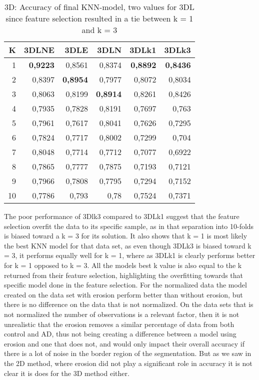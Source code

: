 \begin{table}[H]
  \centering
    \begin{tabular}{|r|r|r|r|r|r|}
    \hline
    K     & 3DLNE & 3DLE  & 3DLN  & 3DLk1 & 3DLk3 \\ \hline
    1     & \textbf{0,9223} & 0,8561 & 0,8374 & \textbf{0,8892} & \textbf{0,8436} \\ \hline
    2     & 0,8397 & \textbf{0,8954} & 0,7977 & 0,8072 & 0,8034 \\ \hline
    3     & 0,8063 & 0,8199 & \textbf{0,8914} & 0,8261 & 0,8426 \\ \hline
    4     & 0,7935 & 0,7828 & 0,8191 & 0,7697 & 0,763 \\ \hline
    5     & 0,7961 & 0,7617 & 0,8041 & 0,7626 & 0,7295 \\ \hline
    6     & 0,7824 & 0,7717 & 0,8002 & 0,7299 & 0,704 \\ \hline
    7     & 0,8048 & 0,7714 & 0,7712 & 0,7077 & 0,6922 \\ \hline
    8     & 0,7865 & 0,7777 & 0,7875 & 0,7193 & 0,7121 \\ \hline
    9     & 0,7966 & 0,7808 & 0,7795 & 0,7294 & 0,7152 \\ \hline
    10    & 0,7786 & 0,793 & 0,78  & 0,7524 & 0,7371 \\ \hline
    \end{tabular}%
  \caption{3D: Accuracy of final KNN-model, two values for 3DL since feature selection resulted in a tie between k = 1 and k = 3}\label{tab:3DFinalModel}%
\end{table}%
The poor performance of 3Dlk3 compared to 3DLk1 suggest that the feature selection overfit the data to its specific sample, as in that separation into 10-folds is biased toward a k = 3 for its solution. It also shows that k = 1 is most likely the best KNN model for that data set, as even though 3DLk3 is biased toward k = 3, it performs equally well for k = 1, where as 3DLk1 is clearly performs better for k = 1 opposed to k = 3. All the models best k value is also equal to the k returned from their feature selection, highlighting the overfitting towards that specific model done in the feature selection.
For the normalized data the model created on the data set with erosion perform better than without erosion, but there is no difference on the data that is not normalized. On the data sets that is not normalized the number of observations is a relevant factor, then it is not unrealistic that the erosion removes a similar percentage of data from both control and AD, thus not being creating a difference between a model using erosion and one that does not, and would only impact their overall accuracy if there is a lot of noise in the border region of the segmentation. But as we saw in the 2D method, where erosion did not play a significant role in accuracy it is not clear it is does for the 3D method either.

